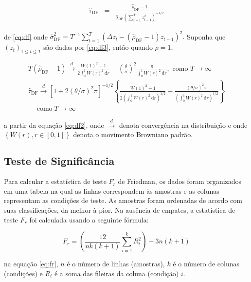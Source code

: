 \begin{eqnarray}
	\hat{\tau}_{\mathrm{DF}}&=&\frac{\hat{\rho}_{\mathrm{DF}}-1}{\hat{\sigma}_{\mathrm{DF}}\left(\sum_{t=1}^T z_{t-1}^2\right)^{-1 / 2}} \label{eq:df}
\end{eqnarray}

\noindent de \eqref{eq:df} onde $\hat{\sigma}_{\mathrm{DF}}^2=T^{-1} \sum_{t=1}^T\left(\Delta z_t-\left(\hat{\rho}_{\mathrm{DF}}-1\right) z_{t-1}\right)^2 .$
Suponha que $\left(z_t\right)_{1 \leq t \leq T}$ são dadas por \eqref{eq:df3}, então quando $\rho=1$,


\begin{eqnarray}
	T\left(\hat{\rho}_{\mathrm{DF}}-1\right) \stackrel{d}{\longrightarrow} \frac{W(1)^2-1}{2 \int_0^1 W(r)^2 \mathrm{~d} r}-\left(\frac{\theta}{\sigma}\right)^2 \frac{\pi}{\int_0^1 W(r)^2 \mathrm{~d} r}, \text { como } T \rightarrow \infty \\
	\hat{\tau}_{\mathrm{DF}} \stackrel{d}{\longrightarrow}\left[1+2(\theta / \sigma)^2 \pi\right]^{-1 / 2}\left\{\frac{W(1)^2-1}{2\left(\int_0^1 W(r)^2 \mathrm{~d} r\right)^{1 / 2}}-\frac{(\theta / \sigma)^2 \pi}{\left(\int_0^1 W(r)^2 \mathrm{~d} r\right)^{1 / 2}}\right\} \\
	\quad \operatorname{como} T \rightarrow \infty\label{eq:df2}
\end{eqnarray}

\noindent a partir da equação \eqref{eq:df2}, onde $\stackrel{d}{\longrightarrow}$ denota convergência na distribuição e onde $\left\{W(r), r \in[0,1]\right\}$ denota o movimento Browniano padrão.

\subsection{Teste de Signific\^ancia}

Para calcular a estatística de teste $F_r$ de Friedman, os dados foram organizados em uma tabela na qual as linhas correspondem às amostras e as colunas representam as condições de teste. As amostras foram ordenadas de acordo com suas classificações, da melhor à pior. Na ausência de empates, a estatística de teste $F_r$ foi calculada usando a seguinte fórmula:

\begin{equation}
	F_r = \left(\frac{12}{n k(k+1)} \sum_{i=1}^k R_i^2\right) - 3n(k+1) \label{eq:fr}
\end{equation}

\noindent na equação \eqref{eq:fr}, $n$ é o número de linhas (amostras), $k$ é o número de colunas (condições) e $R_i$ é a soma das fileiras da coluna (condição) $i$.

